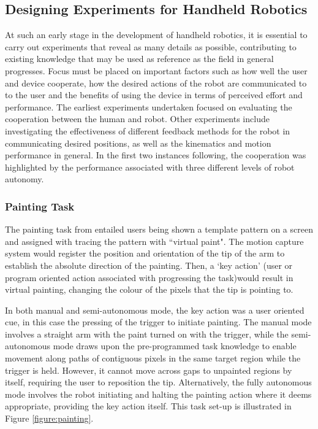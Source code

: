 \documentclass[11pt]{article}
\begin{document}
\subsection{Designing Experiments for Handheld Robotics} \label{designingexperiments}
At such an early stage in the development of handheld robotics, it is essential to carry out experiments that reveal as many details as possible, contributing to existing knowledge that may be used as reference as the field in general progresses. Focus must be placed on important factors such as how well the user and device cooperate, how the desired actions of the robot are communicated to to the user and the benefits of using the device in terms of perceived effort and performance. The earliest experiments undertaken focused on evaluating the cooperation between the human and robot. Other experiments include investigating the effectiveness of different feedback methods for the robot in communicating desired positions, as well as the kinematics and motion performance in general. In the first two instances following, the cooperation was highlighted by the performance associated with three different levels of robot autonomy.

\subsubsection{Painting Task}
The painting task from \cite{GreggSmithDesign} entailed users being shown a template pattern on a screen and assigned with tracing the pattern with ``virtual paint". The motion capture system would register the position and orientation of the tip of the arm to establish the absolute direction of the painting. Then, a `key action' (user or program oriented action associated with progressing the task)would result in virtual painting, changing the colour of the pixels that the tip is pointing to. 

In both manual and semi-autonomous mode, the key action was a user oriented cue, in this case the pressing of the trigger to initiate painting. The manual mode involves a straight arm with the paint turned on with the trigger, while the semi-autonomous mode draws upon the pre-programmed task knowledge to enable movement along paths of contiguous pixels in the same target region while the trigger is held. However, it cannot move across gaps to unpainted regions by itself, requiring the user to reposition the tip. Alternatively, the fully autonomous mode involves the robot initiating and halting the painting action where it deems appropriate, providing the key action itself. This task set-up is illustrated in Figure \ref{figure:painting}.
\end{document}
